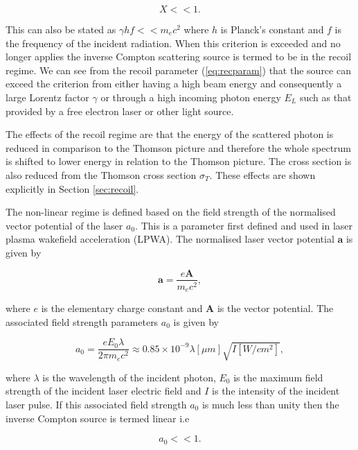 \documentclass[11pt]{article}
\begin{document}
\begin{equation}
X << 1.
\label{eq:recoilcriterion}
\end{equation}

\noindent This can also be stated as $\gamma h f << m_{e}c^{2}$ where $h$ is Planck's constant and $f$ is the frequency of the incident radiation. When this criterion is exceeded and no longer applies the inverse Compton scattering source is termed to be in the recoil regime. We can see from the recoil parameter (\ref{eq:recparam}) that the source can exceed the criterion from either having a high beam energy and consequently a large Lorentz factor $\gamma$ or through a high incoming photon energy $E_{L}$ such as that provided by a free electron laser or other light source.

The effects of the recoil regime are that the energy of the scattered photon is reduced in comparison to the Thomson picture and therefore the whole spectrum is shifted to lower energy in relation to the Thomson picture. The cross section is also reduced from the Thomson cross section $\sigma_{T}$. These effects are shown explicitly in Section \ref{sec:recoil}.

The non-linear regime is defined based on the field strength of the normalised vector potential of the laser $a_{0}$. This is a parameter first defined and used in laser plasma wakefield acceleration (LPWA). The normalised laser vector potential $\bm{a}$ is given by

\begin{equation}
\bm{a} = \frac{e\bm{A}}{m_{e}c^{2}},
\label{eq:nlvp}
\end{equation}

\noindent where $e$ is the elementary charge constant and $\bm{A}$ is the vector potential. The associated field strength parameters $a_{0}$ is given by

\begin{equation}
a_{0} = \frac{eE_{0}\lambda}{2\pi m_{e}c^{2}} \approx 0.85\times 10^{-9} \lambda [\mu m] \sqrt{I [W/cm^{2}]},
\label{eq:a0}
\end{equation}

\noindent where $\lambda$ is the wavelength of the incident photon, $E_{0}$ is the maximum field strength of the incident laser electric field and $I$ is the intensity of the incident laser pulse. If this associated field strength $a_{0}$ is much less than unity then the inverse Compton source is termed linear i.e 

\begin{equation}
a_{0} << 1.
\label{eq:lincrit}
\end{equation}
\end{document}
